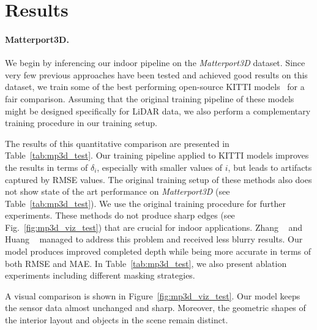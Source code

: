 \documentclass[final]{cvpr}
\begin{document}
\section{Results}\label{sec:Matterport3D}

    \paragraph{Matterport3D.} We begin by inferencing our indoor pipeline on the \emph{Matterport3D} dataset. Since very few previous approaches have been tested and achieved good results on this dataset, we train some of the best performing open-source KITTI models~\cite{msg_chn, wvangansbeke_depth_2019} for a fair comparison. Assuming that the original training pipeline of these models might be designed specifically for LiDAR data, we also perform a complementary training procedure in our training setup. 
    
    The results of this quantitative comparison are presented in Table~\ref{tab:mp3d_test}. 
Our training pipeline applied to KITTI models improves the results in terms of $\delta_i$, especially with smaller values of $i$, but leads to artifacts captured by RMSE values. The original training setup of these methods also does not show state of the art performance on \emph{Matterport3D} (see Table~\ref{tab:mp3d_test}). We use the original training procedure for further experiments. These methods do not produce sharp edges (see Fig.~\ref{fig:mp3d_viz_test}) that are crucial for indoor applications. Zhang \etal~\cite{DBLP:journals/corr/abs-1803-09326} and Huang \etal~\cite{Huang_2019} managed to address this problem and received less blurry results. Our model produces improved completed depth while being more accurate in terms of both RMSE and MAE. In Table~\ref{tab:mp3d_test}, we also present ablation experiments including different masking strategies.  
    
    A visual comparison is shown in Figure~\ref{fig:mp3d_viz_test}. Our model keeps the sensor data almost unchanged and sharp. 
Moreover, the geometric shapes of the interior layout and objects in the scene remain distinct.
    
\end{document}
